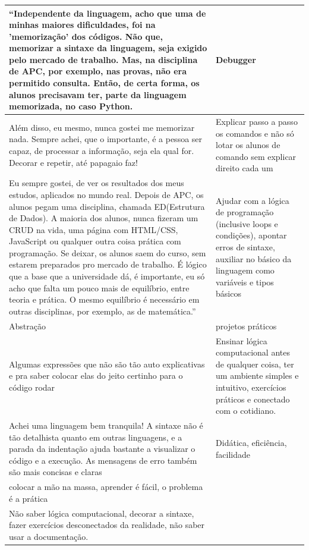 \begin{longtable}{| p{} | p{} |}
    ``Independente da linguagem, acho que uma de minhas maiores dificuldades, foi na 'memorização' dos códigos. Não que, memorizar a sintaxe da linguagem, seja exigido pelo mercado de trabalho. Mas, na disciplina de APC, por exemplo, nas provas, não era permitido consulta. Então, de certa forma, os alunos precisavam ter, parte da linguagem memorizada, no caso Python. & Debugger \\ \hline
    Além disso, eu mesmo, nunca gostei me memorizar nada. Sempre achei, que o importante, é a pessoa ser capaz, de processar a informação, seja ela qual for. Decorar e repetir, até papagaio faz! & Explicar passo a passo os comandos e não só lotar os alunos de comando sem explicar direito cada um \\ \hline
    Eu sempre gostei, de ver os resultados dos meus estudos, aplicados no mundo real. Depois de APC, os alunos pegam uma disciplina, chamada ED(Estrutura de Dados). A maioria dos alunos, nunca fizeram um CRUD na vida, uma página com HTML/CSS, JavaScript ou qualquer outra coisa prática com programação. Se deixar, os alunos saem do curso, sem estarem preparados pro mercado de trabalho. É lógico que a base que a universidade dá, é importante, eu só acho que falta um pouco mais de equilíbrio, entre teoria e prática. O mesmo equilíbrio é necessário em outras disciplinas, por exemplo, as de matemática.'' & Ajudar com a lógica de programação (inclusive loops e condições),  apontar erros de sintaxe, auxiliar no básico da linguagem como variáveis e tipos básicos \\ \hline
    Abstração & projetos práticos \\ \hline
    Algumas expressões que não são tão auto explicativas e pra saber colocar elas do jeito certinho para o código rodar & Ensinar lógica computacional antes de qualquer coisa, ter um ambiente simples e intuitivo, exercícios práticos e conectado com o cotidiano. \\ \hline
    Achei uma linguagem bem tranquila! A sintaxe não é tão detalhista quanto em outras linguagens, e a parada da indentação ajuda bastante a visualizar o código e a execução. As mensagens de erro também são mais concisas e claras & Didática, eficiência, facilidade \\ \hline
    colocar a mão na massa, aprender é fácil, o problema é a prática & ~ \\ \hline
    Não saber lógica computacional, decorar a sintaxe, fazer exercícios desconectados da realidade, não saber usar a documentação. & ~ \\ \hline

\end{longtable}

